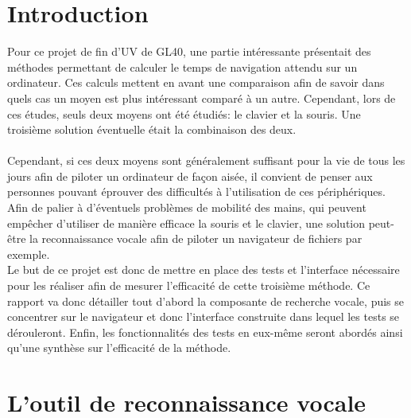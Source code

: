 \documentclass[a4paper, 11pt]{report}
\begin{document}
	\newpage
	
	
	
	\chapter*{Introduction}
	
	Pour ce projet de fin d'UV de GL40, une partie intéressante présentait des méthodes permettant de calculer le temps de navigation attendu sur un ordinateur. Ces calculs mettent en avant une comparaison afin de savoir dans quels cas un moyen est plus intéressant comparé à un autre. Cependant, lors de ces études, seuls deux moyens ont été étudiés: le clavier et la souris. Une troisième solution éventuelle était la combinaison des deux.\\ \ \\
	Cependant, si ces deux moyens sont généralement suffisant pour la vie de tous les jours afin de piloter un ordinateur de façon aisée, il convient de penser aux personnes pouvant éprouver des difficultés à l'utilisation de ces périphériques. Afin de palier à d'éventuels problèmes de mobilité des mains, qui peuvent empêcher d'utiliser de manière efficace la souris et le clavier, une solution peut-être la reconnaissance vocale afin de piloter un navigateur de fichiers par exemple.\\
	Le but de ce projet est donc de mettre en place des tests et l'interface nécessaire pour les réaliser afin de mesurer l'efficacité de cette troisième méthode. Ce rapport va donc détailler tout d'abord la composante de recherche vocale, puis se concentrer sur le navigateur et donc l'interface construite dans lequel les tests se dérouleront. Enfin, les fonctionnalités des tests en eux-même seront abordés ainsi qu'une synthèse sur l'efficacité de la méthode.
	
	\chapter{L'outil de reconnaissance vocale}
	
\end{document}
